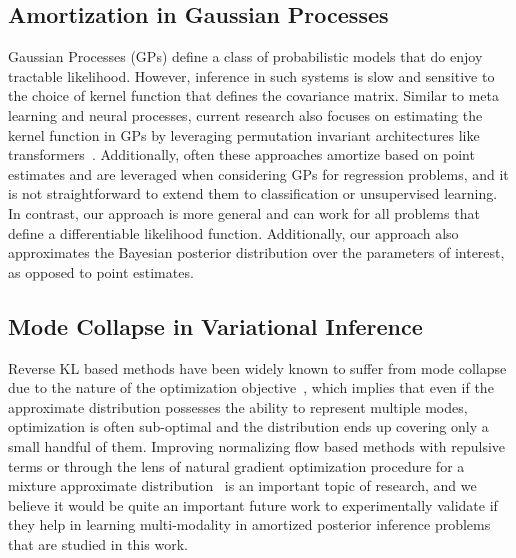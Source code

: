 \subsection{Amortization in Gaussian Processes}
Gaussian Processes (GPs) define a class of probabilistic models that do enjoy tractable likelihood. However, inference in such systems is slow and sensitive to the choice of kernel function that defines the covariance matrix. Similar to meta learning and neural processes, current research also focuses on estimating the kernel function in GPs by leveraging permutation invariant architectures like transformers~\citep{liu2020task,simpson2021kernel,bitzer2023amortized}. Additionally, often these approaches amortize based on point estimates and are leveraged when considering GPs for regression problems, and it is not straightforward to extend them to classification or unsupervised learning. In contrast, our approach is more general and can work for all problems that define a differentiable likelihood function. Additionally, our approach also approximates the Bayesian posterior distribution over the parameters of interest, as opposed to point estimates.

\subsection{Mode Collapse in Variational Inference}
Reverse KL based methods have been widely known to suffer from mode collapse due to the nature of the optimization objective~\citep{bishop2006pattern}, which implies that even if the approximate distribution possesses the ability to represent multiple modes, optimization is often sub-optimal and the distribution ends up covering only a small handful of them. Improving normalizing flow based methods with repulsive terms or through the lens of natural gradient optimization procedure for a mixture approximate distribution~\citep{arenz2022unified,lin2020handling} is an important topic of research, and we believe it would be quite an important future work to experimentally validate if they help in learning multi-modality in amortized posterior inference problems that are studied in this work.